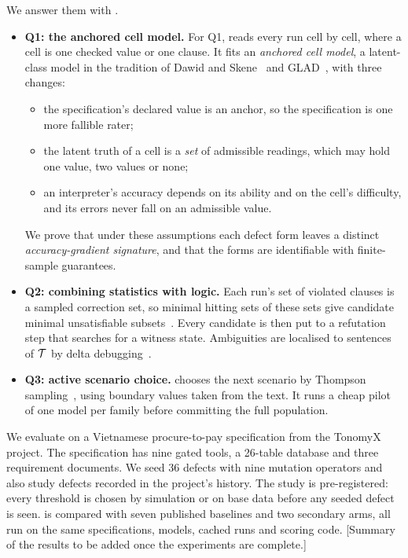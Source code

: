 We answer them with \specdx.
\begin{itemize}[leftmargin=*]
\item \textbf{Q1: the anchored cell model.} For Q1, \specdx reads every run cell by cell, where a cell is one checked value or one clause. It fits an \emph{anchored cell model}, a latent-class model in the tradition of Dawid and Skene~\cite{dawid1979maximum} and GLAD~\cite{whitehill2009whose}, with three changes:
  \begin{itemize}
  \item the specification's declared value is an anchor, so the specification is one more fallible rater;
  \item the latent truth of a cell is a \emph{set} of admissible readings, which may hold one value, two values or none;
  \item an interpreter's accuracy depends on its ability and on the cell's difficulty, and its errors never fall on an admissible value.
  \end{itemize}
  We prove that under these assumptions each defect form leaves a distinct \emph{accuracy-gradient signature}, and that the forms are identifiable with finite-sample guarantees.
\item \textbf{Q2: combining statistics with logic.} Each run's set of violated clauses is a sampled correction set, so minimal hitting sets of these sets give candidate minimal unsatisfiable subsets~\cite{reiter1987theory,liffiton2008algorithms}. Every candidate is then put to a refutation step that searches for a witness state. Ambiguities are localised to sentences of $\mathcal{T}$ by delta debugging~\cite{zeller2002simplifying}.
\item \textbf{Q3: active scenario choice.} \specdx chooses the next scenario by Thompson sampling~\cite{russo2018tutorial}, using boundary values taken from the text. It runs a cheap pilot of one model per family before committing the full population.
\end{itemize}

We evaluate \specdx on a Vietnamese procure-to-pay specification from the TonomyX project. The specification has nine gated tools, a 26-table database and three requirement documents. We seed 36 defects with nine mutation operators and also study defects recorded in the project's history. The study is pre-registered: every threshold is chosen by simulation or on base data before any seeded defect is seen. \specdx is compared with seven published baselines and two secondary arms, all run on the same specifications, models, cached runs and scoring code. [Summary of the results to be added once the experiments are complete.]

